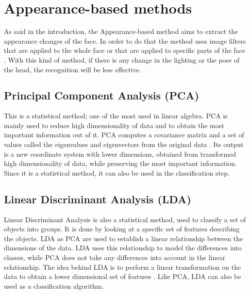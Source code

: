 \section{Appearance-based methods}

\noindent As said in the introduction, the Appearance-based method aims to extract the appearance changes of the face. In order to do that the method uses image filters that are applied to the whole face or that are applied to specific parts of the face \cite{SHA09}. With this kind of method, if there is any change in the lighting or the pose of the head, the recognition will be less effective.
\newline

\subsection{Principal Component Analysis (PCA)}

\vspace{\baselineskip}
\noindent This is a statistical method; one of the most used in linear algebra. PCA is mainly used to reduce high dimensionality of data and to obtain the most important information out of it. PCA computes a covariance matrix and a set of values called the eigenvalues and eigenvectors from the original data \cite{GAN08}. Its output is a new coordinate system with lower dimensions, obtained from transformed high dimensionality of data, while preserving the most important information.  Since it is a statistical method, it can also be used in the classification step.
\newline

\subsection{Linear Discriminant Analysis (LDA)}

\vspace{\baselineskip}
\noindent Linear Discriminant Analysis is also a statistical method, used to classify a set of objects into groups. It is done by looking at a specific set of features describing the objects. LDA as PCA are used to establish a linear relationship between the dimensions of the data. LDA uses this relationship to model the differences into classes, while PCA does not take any differences into account in the linear relationship. The idea behind LDA  is to perform a linear transformation on the data to obtain a lower dimensional set of features \cite{GAN08}. Like PCA, LDA can also be used as a classification algorithm.
\newline

